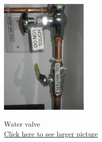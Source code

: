 \documentclass{../lab}
\begin{document}
\begin{figure}[H]
  \label{fig:LaserApparatus}
\endminipage\hfill
{}
\centering
  \href{http://experimentationlab.berkeley.edu/sites/default/files/CO-2/CO2_H2O_3529B.jpg}{\includegraphics[height=160pt,keepaspectratio]{images/CO2_H2O_3529B.jpg}}
  \caption{Water valve \\ \href{http://experimentationlab.berkeley.edu/sites/default/files/CO-2/CO2_H2O_3529B.jpg}{Click here to see larger picture}}\label{fig:WaterValve}
\endminipage
\end{figure}
\end{document}
